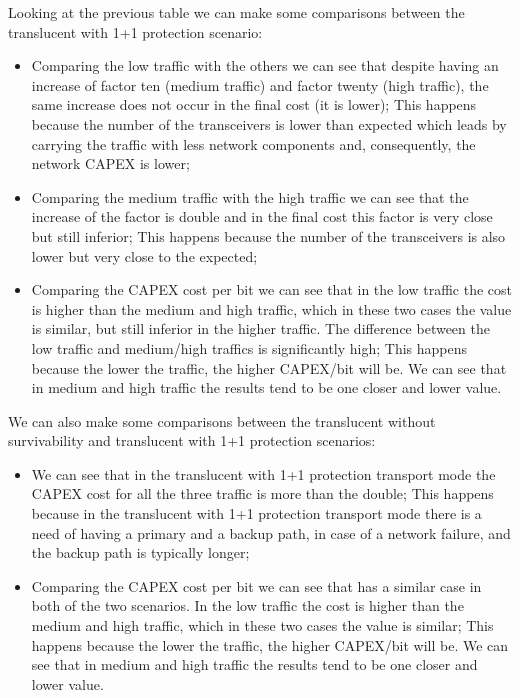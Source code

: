 \noindent
Looking at the previous table we can make some comparisons between the translucent with 1+1 protection scenario:

\begin{itemize}
  \item Comparing the low traffic with the others we can see that despite having an increase of factor ten (medium traffic) and factor twenty (high traffic), the same increase does not occur in the final cost (it is lower);
  \subitem This happens because the number of the transceivers is lower than expected which leads by carrying the traffic with less network components and, consequently, the network CAPEX is lower;
  \item Comparing the medium traffic with the high traffic we can see that the increase of the factor is double and in the final cost this factor is very close but still inferior;
  \subitem This happens because the number of the transceivers is also lower but very close to the expected;
  \item Comparing the CAPEX cost per bit we can see that in the low traffic the cost is higher than the medium and high traffic, which in these two cases the value is similar, but still inferior in the higher traffic. The difference between the low traffic and medium/high traffics is significantly high;
  \subitem This happens because the lower the traffic, the higher CAPEX/bit will be. We can see that in medium and high traffic the results tend to be one closer and lower value.
\end{itemize}

\noindent
We can also make some comparisons between the translucent without survivability and translucent with 1+1 protection scenarios:

\begin{itemize}
  \item We can see that in the translucent with 1+1 protection transport mode the CAPEX cost for all the three traffic is more than the double;
    \subitem This happens because in the translucent with 1+1 protection transport mode there is a need of having a primary and a backup path, in case of a network failure, and the backup path is typically longer;
  \item Comparing the CAPEX cost per bit we can see that has a similar case in both of the two scenarios. In the low traffic the cost is higher than the medium and high traffic, which in these two cases the value is similar;
  \subitem This happens because the lower the traffic, the higher CAPEX/bit will be. We can see that in medium and high traffic the results tend to be one closer and lower value.
\end{itemize}

